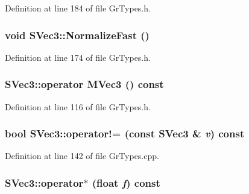 Definition at line 184 of file GrTypes.h.\hypertarget{struct_s_vec3_01a11562d5614c7b0b635b5ef9715c49}{
\subsubsection[{NormalizeFast}]{\setlength{\rightskip}{0pt plus 5cm}void SVec3::NormalizeFast ()}}
\label{struct_s_vec3_01a11562d5614c7b0b635b5ef9715c49}




Definition at line 174 of file GrTypes.h.\hypertarget{struct_s_vec3_feb6cc5887cb360146ca4add14f935dc}{
\subsubsection[{operator MVec3}]{\setlength{\rightskip}{0pt plus 5cm}SVec3::operator {\bf MVec3} () const}}
\label{struct_s_vec3_feb6cc5887cb360146ca4add14f935dc}




Definition at line 116 of file GrTypes.h.\hypertarget{struct_s_vec3_1149fc5a45c5b8fdbceddf313736be9c}{
\subsubsection[{operator!=}]{\setlength{\rightskip}{0pt plus 5cm}bool SVec3::operator!= (const {\bf SVec3} \& {\em v}) const}}
\label{struct_s_vec3_1149fc5a45c5b8fdbceddf313736be9c}




Definition at line 142 of file GrTypes.cpp.\hypertarget{struct_s_vec3_e3d43793ba784f64df8bf332f1e8e2a7}{
\subsubsection[{operator$\ast$}]{ SVec3::operator$\ast$ (float {\em f}) const}}
\label{struct_s_vec3_e3d43793ba784f64df8bf332f1e8e2a7}




